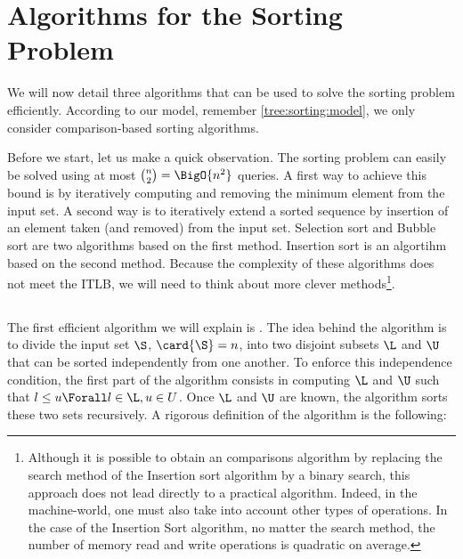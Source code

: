 \section{Algorithms for the Sorting Problem}
\label{tree:sorting:alg}

We will now detail three algorithms that can be used to solve the sorting
problem efficiently. According to our model, remember \ref{tree:sorting:model},
we only consider comparison-based sorting algorithms.


Before we start, let us make a quick observation. The sorting problem can
easily be solved using at most \(\binom{n}{2} = \BigO{n^2}\) queries. A first
way to achieve this bound is by iteratively computing and removing the minimum
element from the input set. A second way is to iteratively
extend a sorted sequence by insertion of an element taken (and removed) from
the input set. Selection sort and Bubble sort are two algorithms based on the
first method. Insertion sort is an algortihm based on the second method.
Because the complexity of these algorithms does not meet the ITLB, we will need
to think about more clever methods\footnote{Although it is possible to obtain
an  comparisons algorithm by replacing the search method of the
Insertion sort algorithm by a binary search, this approach does not lead directly
to a practical algorithm. Indeed, in the machine-world, one must also take
into account other types of operations. In the case of the Insertion Sort
algorithm, no matter the search method, the number of memory read and write
operations is quadratic on average.}.

\subsection*{\quicksort}

The first efficient algorithm we will explain is \quicksort \cite{hoare:1962}.
The idea behind the \quicksort algorithm is to divide the input set \(\S\),
\(\card{\S} = n\), into two disjoint subsets \(\L\) and \(\U\) that can be
sorted independently from one another. To enforce this independence condition,
the first part of the algorithm consists in computing \(\L\) and \(\U\) such
that \(l \le u \Forall l \in \L, u \in U\). Once \(\L\) and \(\U\) are known,
the algorithm sorts these two sets recursively. A rigorous definition of the
algorithm is the following:

